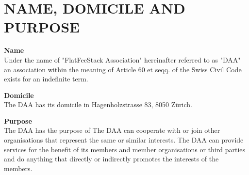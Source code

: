 \section{NAME, DOMICILE AND PURPOSE}

\item \textbf{Name} \\
Under the name of "FlatFeeStack Association" hereinafter referred to as "DAA" an association within the meaning of Article 60 et seqq. of the Swiss Civil Code exists for an indefinite term.

\item \textbf{Domicile} \\
The DAA has its domicile in Hagenholzstrasse 83, 8050 Zürich.

\item \textbf{Purpose} \\
The DAA has the purpose of %
The DAA can cooperate with or join other organisations that represent the same or similar interests.
The DAA can provide services for the benefit of its members and member organisations or third parties and do anything that directly or indirectly promotes the interests of the members.
